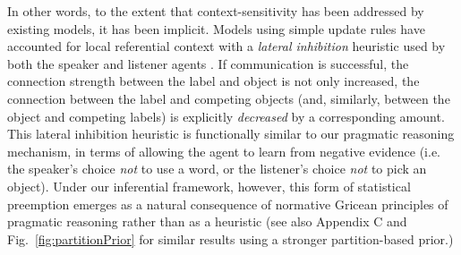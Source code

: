 %
In other words, to the extent that context-sensitivity has been addressed by existing models, it has been implicit. 
Models using simple update rules have accounted for local referential context with a \emph{lateral inhibition} heuristic used by both the speaker and listener agents \cite{franke2012bidirectional,steels2005coordinating}.
If communication is successful, the connection strength between the label and object is not only increased, the connection between the label and competing objects (and, similarly, between the object and competing labels) is explicitly \emph{decreased} by a corresponding amount.
This lateral inhibition heuristic is functionally similar to our pragmatic reasoning mechanism, in terms of allowing the agent to learn from negative evidence (i.e. the speaker's choice \emph{not} to use a word, or the listener's choice \emph{not} to pick an object). 
Under our inferential framework, however, this form of statistical preemption emerges as a natural consequence of normative Gricean principles of pragmatic reasoning rather than as a heuristic (see also Appendix C and Fig.~\ref{fig:partitionPrior} for similar results using a stronger partition-based prior.)

